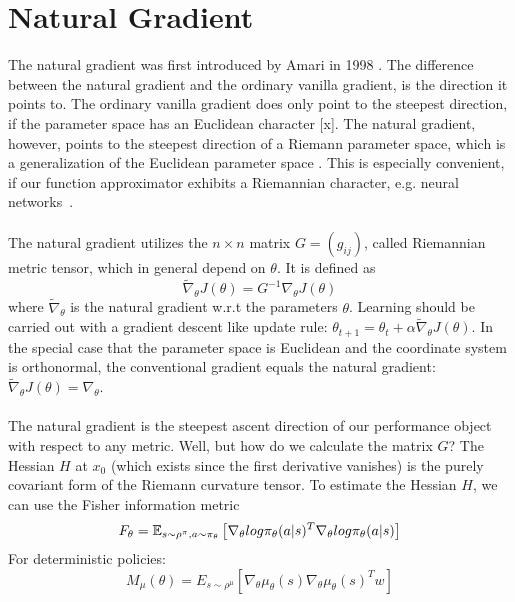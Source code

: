 \section{Natural Gradient}
\citep{amari1987differential}
The natural gradient was first introduced by Amari in 1998 \cite{amari1998natural}. The difference between the natural gradient and the ordinary vanilla gradient, is the direction it points to. The ordinary vanilla gradient does only point to the steepest direction, if the parameter space has an Euclidean character [x]. The natural gradient, however, points to the steepest direction of a Riemann parameter space, which is a generalization of the Euclidean parameter space \citep{haykin2009neural, amari1998natural}. This is especially convenient, if our function approximator exhibits a Riemannian character, e.g. neural networks \citep{amari1998natural}.
\\\\
The natural gradient utilizes the $n \times n$ matrix $G = (g_{ij})$, called Riemannian metric tensor, which in general depend on $\theta$. It is defined as
\begin{equation}
	\widetilde{\nabla}_{\theta} J(\theta) = G^{-1} \nabla_\theta J(\theta)
\end{equation}
where $\widetilde{\nabla}_{\theta}$ is the natural gradient w.r.t the parameters $\theta$.  Learning should be carried out with a gradient descent like update rule: $\theta_{t+1} = \theta_{t} + \alpha \widetilde{\nabla}_{\theta} J(\theta)$. In the special case that the parameter space is Euclidean and the coordinate system is orthonormal, the conventional gradient equals the natural gradient: $\widetilde{\nabla}_{\theta} J(\theta) = \nabla_{\theta}$.
\\\\
The natural gradient is the steepest ascent direction of our performance object with respect to any metric. Well, but how do we calculate the matrix $G$? The Hessian $H$ at $x_0$ (which exists since the first derivative vanishes) is the purely covariant form of the Riemann curvature tensor. To estimate the Hessian $H$, we can use the Fisher information metric 
\begin{equation}
	F_\theta=\operatorname{\mathbb{E}}_{s\sim\rho^{\pi},a\sim\pi_{\theta}}\left[\nabla_{\theta}log\pi_{\theta}(a|s)^{T}\nabla_{\theta}log\pi_{\theta}(a|s)\right]
\end{equation}
For deterministic policies: 
\begin{equation}
	M_{\mu}(\theta)=E_{s\sim\rho^{\mu}}[\nabla_{\theta}\mu_{\theta}(s)\nabla_{\theta}\mu_{\theta}(s)^{T}w]
\end{equation}

